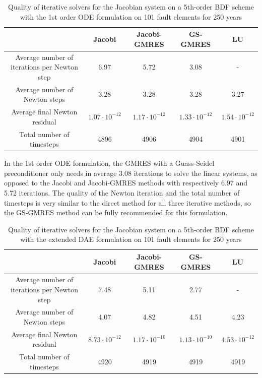 \begin{table}[H]
	\begin{tabular}{ | c || c c c | c |}
		\hline
		& Jacobi & Jacobi-GMRES & GS-GMRES & LU \\ \hline\hline
		Average number of iterations per Newton step &  6.97  &    5.72   &    3.08  & -  \\
		Average number of Newton steps & 3.28  &     3.28    &   3.28  &     3.27 \\
		Average final Newton residual &   $1.07\cdot10^{-12}$  & $1.17\cdot10^{-12}$  & $1.33\cdot10^{-12}$  & $1.54\cdot10^{-12}$ \\		Total number of timesteps & 4896  &      4906    &    4904    &    4901 \\
		\hline
	\end{tabular}
	\caption{Quality of iterative solvers for the Jacobian system on a 5th-order BDF scheme with the 1st order ODE formulation on 101 fault elements for 250 years}
	\label{tab:compactODE_iterativeSolversJacobian}
\end{table}

In the 1st order ODE formulation, the GMRES with a Guass-Seidel preconditioner only needs in average 3.08 iterations to solve the linear systems, as opposed to the Jacobi and Jacobi-GMRES methods with respectively 6.97 and 5.72 iterations. The quality of the Newton iteration and the total number of timesteps is very similar to the direct method for all three iterative methods, so the GS-GMRES method can be fully recommended for this formulation. 

\begin{table}[H]
	\begin{tabular}{ | c || c c c | c |}
		\hline
		& Jacobi & Jacobi-GMRES & GS-GMRES & LU \\ \hline\hline
		Average number of iterations per Newton step &  7.48  &    5.11   &    2.77  & -  \\
		Average number of Newton steps & 4.07  &     4.82    &   4.51  &     4.23 \\
		Average final Newton residual &   $8.73\cdot10^{-12}$  & $1.17\cdot10^{-10}$  & $1.13\cdot10^{-10}$  & $4.53\cdot10^{-12}$ \\ 
		Total number of timesteps & 4920  &      4919    &    4919    &    4919 \\
		\hline
	\end{tabular}
	\caption{Quality of iterative solvers for the Jacobian system on a 5th-order BDF scheme with the extended DAE formulation on 101 fault elements for 250 years}
	\label{tab:extendedDAE_iterativeSolversJacobian}
\end{table}

